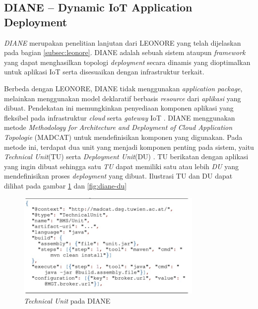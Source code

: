 \subsection{DIANE – Dynamic IoT Application Deployment}
\textit{DIANE} merupakan penelitian lanjutan dari LEONORE yang telah dijelaskan pada bagian \ref{subsec:leonore}. DIANE adalah sebuah sistem ataupun \textit{framework} yang dapat menghasilkan topologi \textit{deployment} secara dinamis yang dioptimalkan untuk aplikasi IoT serta disesuaikan dengan infrastruktur terkait.

Berbeda dengan LEONORE, DIANE tidak menggunakan \textit{application package}, melainkan menggunakan model deklaratif berbasis \textit{resource} dari \textit{aplikasi} yang dibuat. Pendekatan ini memungkinkan penyediaan komponen aplikasi yang fleksibel pada infrastruktur \textit{cloud} serta \textit{gateway} IoT \parencite{vogler2015diane}. DIANE menggunakan metode \textit{Methodology for Architecture and Deployment of Cloud Application Topologie} (MADCAT) untuk mendefinisikan komponen yang digunakan. Pada metode ini, terdapat dua unit yang menjadi komponen penting pada sistem, yaitu \textit{Technical Unit}(TU) serta \textit{Deployment Unit}(DU) \parencite{madcat}. TU berikatan dengan aplikasi yang ingin dibuat sehingga satu \textit{TU} dapat memiliki satu atau lebih \textit{DU} yang mendefinisikan proses \textit{deployment} yang dibuat. Ilustrasi TU dan DU dapat dilihat pada gambar \ref{fig:diane-tu} dan \ref{fig:diane-du}

\begin{figure}[ht]
  \centering
  \includegraphics[width=0.8\textwidth]{resources/chapter-2/diane-technical-unit.jpg}
  \caption{\textit{Technical Unit} pada DIANE \parencite{vogler2015diane}}
  \label{fig:diane-tu}
\end{figure}

